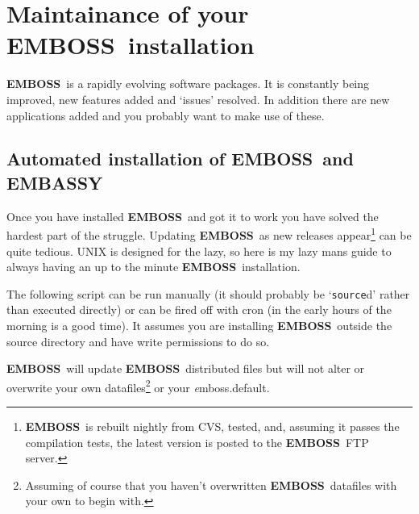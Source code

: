 \documentclass{report}
\newcommand{\ilcomm}[1]{{\tt #1}}
\newcommand{\filename}[1]{{\sf\textsl #1}}
\newcommand{\EMBOSS}{{\sf\bfseries EMBOSS}}
\begin{document}
\section{Maintainance of your \EMBOSS\ installation}

\EMBOSS\ is a rapidly evolving software packages. It is constantly being improved, new features added and `issues' resolved. In addition there are new applications added and you probably want to make use of these.

\subsection{Automated installation of \EMBOSS\ and EMBASSY}

Once you have installed \EMBOSS\ and got it to work you have solved the hardest part of the struggle. Updating \EMBOSS\ as new releases appear\footnote{\EMBOSS\ is rebuilt nightly from CVS, tested, and, assuming it passes the compilation tests, the latest version is posted to the \EMBOSS\ FTP server. } can be quite tedious. UNIX is designed for the lazy, so here is my lazy mans guide to always having an up to the minute \EMBOSS\ installation.

The following script can be run manually (it should probably be `\ilcomm{source}d' rather than executed directly) or can be fired off with cron (in the early hours of the morning is a good time). It assumes you are installing \EMBOSS\ outside the source directory and have write permissions to do so.

\EMBOSS\ will update \EMBOSS\ distributed files but will not alter or overwrite your own datafiles\footnote{Assuming of course that you haven't overwritten \EMBOSS\ datafiles with your own to begin with.} or your \filename{emboss.default}.
\end{document}
